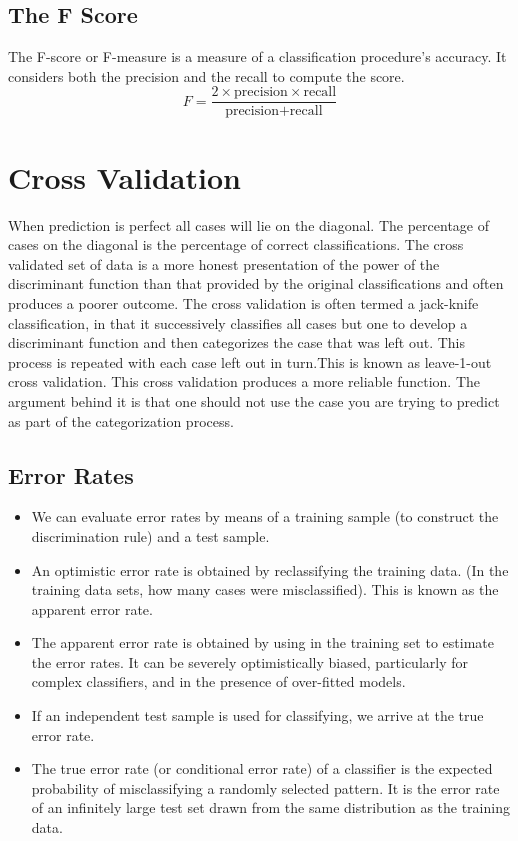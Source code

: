 \documentclass[a4paper,12pt]{article}
\begin{document}
\subsection*{The F Score}
The F-score or F-measure is a measure of a classification procedure’s accuracy.
It considers both the precision and the recall to compute the score.
\[ F = \frac{2 \times \mbox{precision} \times \mbox{recall}}{\mbox{precision} + \mbox{recall}}\]


\section*{ Cross Validation}
When prediction
is perfect all cases will lie on the diagonal. The percentage of cases on the
diagonal is the percentage of correct classifications. The cross validated set of
data is a more honest presentation of the power of the discriminant function
than that provided by the original classifications and often produces a poorer
outcome. The cross validation is often termed a jack-knife classification, in
that it successively classifies all cases but one to develop a discriminant
function and then categorizes the case that was left out. This process is
repeated with each case left out in turn.This is known as leave-1-out cross
validation.
This cross validation produces a more reliable function. The argument
behind it is that one should not use the case you are trying to predict as part
of the categorization process.
\subsection*{Error Rates}
\begin{itemize}
	\item We can evaluate error rates by means of a training sample (to construct the
	discrimination rule) and a test sample.
	\item An optimistic error rate is obtained by reclassifying the training data. (In
	the training data sets, how many cases were misclassified). This is known
	as the apparent error rate.
	\item The apparent error rate is obtained by using in the training set to estimate
	the error rates. It can be severely optimistically biased, particularly for
	complex classifiers, and in the presence of over-fitted models.
	\item If an independent test sample is used for classifying, we arrive at the true
	error rate.
	\item The true error rate (or conditional error rate) of a classifier is the
	expected probability of misclassifying a randomly selected pattern. It is the
	error rate of an infinitely large test set drawn from the same distribution as
	the training data.
\end{itemize}
\end{document}
